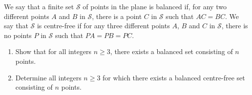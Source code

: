 We say that a finite set $\mathcal{S}$ of points in the plane is balanced if, for any two different points $A$ and $B$ in $\mathcal{S}$,  there is a point $C$ in $\mathcal{S}$ such that $AC=BC$. We say that $\mathcal{S}$ is centre-free if for any three different points $A$,  $B$ and $C$ in $\mathcal{S}$,  there is no points $P$ in $\mathcal{S}$ such that $PA=PB=PC$.

\begin{enumerate}[label = (\alph*)]
	\item Show that for all integers $n\ge 3$,  there exists a balanced set consisting of $n$ points.
	\item Determine all integers $n\ge 3$ for which there exists a balanced centre-free set consisting of $n$ points.
\end{enumerate}
